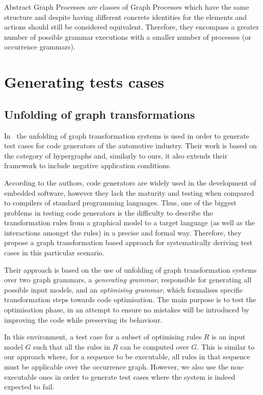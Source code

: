 Abstract Graph Processes are classes of Graph Processes which have the same structure and despite having different concrete identities for the elements and actions should still be considered equivalent. Therefore, they encompass a greater number of possible grammar executions with a smaller number of processes (or occurrence grammars).


\section{Generating tests cases}

\subsection{Unfolding of graph transformations}

  In~\cite{Baldan2004} the unfolding of graph transformation systems is used in order to generate test cases for code generators of the automotive industry.
  Their work is based on the category of hypergraphs and, similarly to ours, it also extends their framework to include negative application conditions.

  According to the authors, code generators are widely used in the development of embedded software, however they lack the maturity and testing when compared to compilers of standard programming languages.
  Thus, one of the biggest problems in testing code generators is the difficulty to describe the transformation rules from a graphical model to a target language (as well as the interactions amongst the rules) in a precise and formal way.
  Therefore, they propose a graph transformation based approach for systematically deriving test cases in this particular scenario.

Their approach is based on the use of unfolding of graph transformation systems~\cite{Ribeiro1996} over two graph grammars, a \textit{generating grammar}, responsible for generating all possible input models, and an \textit{optimising grammar}, which formalises specific transformation steps towards code optimisation.
The main purpose is to test the optimisation phase, in an attempt to ensure no mistakes will be introduced by improving the code while preserving its behaviour.


In this environment, a test case for a subset of optimising rules $R$ is an input model $G$ such that all the rules in $R$ can be computed over $G$. This is similar to our approach where, for a sequence to be executable, all rules in that sequence must be applicable over the occurrence graph. However, we also use the non-executable ones in order to generate test cases where the system is indeed expected to fail.


